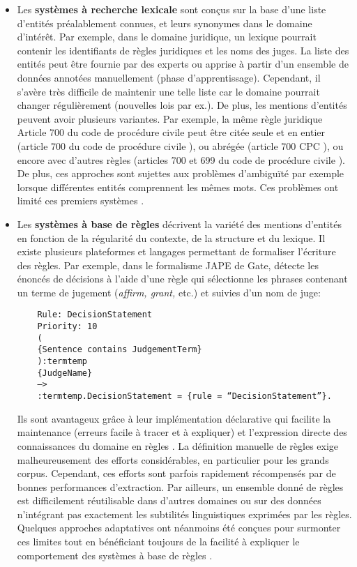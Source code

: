 \begin{itemize}
\item Les \textbf{systèmes à recherche lexicale} sont conçus sur la base d'une liste d'entités préalablement connues, et leurs synonymes dans le domaine d'intérêt. Par exemple, dans le domaine juridique, un lexique pourrait contenir les identifiants de règles juridiques et les noms des juges. La liste des entités peut être fournie par des experts ou apprise à partir d'un ensemble de données annotées manuellement (phase d'apprentissage). Cependant, il s'avère très difficile de maintenir une telle liste car le domaine pourrait changer régulièrement (nouvelles lois par ex.). De plus, les mentions d'entités peuvent avoir plusieurs variantes. Par exemple, la même règle juridique \og Article 700 du code de procédure civile \fg{} peut être citée seule et en entier (\og article 700 du code de procédure civile \fg{}), ou abrégée (\og article 700 CPC \fg{}), ou encore avec d'autres règles (\og articles 700 et 699 du code de procédure civile \fg{}). De plus, ces approches sont sujettes aux problèmes d'ambiguïté par exemple lorsque différentes entités comprennent les mêmes mots. Ces problèmes ont limité ces premiers systèmes \citep{palmer1997learnedLookup}.

\item Les \textbf{systèmes à base de règles} décrivent la variété des mentions d'entités en fonction de la régularité du contexte, de la structure et du lexique. Il existe plusieurs plateformes et langages permettant de formaliser l'écriture des règles. Par exemple, dans le formalisme JAPE de Gate, \citet{wyner2010extractlegalelts} détecte les énoncés de décisions à l'aide d'une règle qui sélectionne les phrases contenant un terme de jugement (\textit{affirm, grant,} etc.) et suivies d'un nom de juge:

\begin{verbatim}
	Rule: DecisionStatement
	Priority: 10
	(
	{Sentence contains JudgementTerm}
	):termtemp
	{JudgeName}
	–>
	:termtemp.DecisionStatement = {rule = “DecisionStatement”}.
\end{verbatim}

 Ils sont avantageux grâce à leur implémentation déclarative qui facilite la maintenance (erreurs facile à tracer et à expliquer) et l'expression directe des connaissances du domaine en règles \citep{waltl2018ruleiesurvey}. La définition manuelle de règles exige malheureusement des efforts considérables, en particulier pour les grands corpus. Cependant, ces efforts sont parfois rapidement récompensés par de bonnes performances d'extraction.  Par ailleurs, un ensemble donné de règles est difficilement réutilisable dans d'autres domaines ou sur des données n'intégrant pas exactement les subtilités linguistiques exprimées par les règles. Quelques approches adaptatives ont néanmoins été conçues pour surmonter ces limites tout en bénéficiant toujours de la facilité à expliquer le comportement des systèmes à base de règles \citep{siniakov2008gropusrulebased,chiticariu2010adaptativerulebased}.


\end{itemize}
